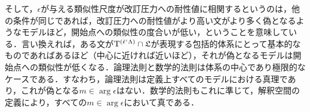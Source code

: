 そして，$\epsilon$が与える類似性尺度が改訂圧力への耐性値に相関するというのは，他の条件が同じであれば，改訂圧力への耐性値がより高い文がより多く偽となるようなモデルほど，開始点への類似性の度合いが低い，ということを意味している．言い換えれば，ある文が$ \mathrm{T}^{(\breve{\epsilon}{\mspace{1mu}{`}\mspace{1mu}} \Lambda)}\cap \mathfrak{L} $が表現する包括的体系にとって基本的なものであればあるほど（中心に近ければ近いほど），それが偽となるモデルは開始点への類似性が低くなる．論理法則と数学的法則は体系の中心であり極限的なケースである．すなわち，論理法則は定義上すべてのモデルにおける真理であり，これが偽となる$m\in\arg\epsilon$はない．数学的法則もこれに準じて，解釈空間の定義により，すべての$m\in\arg\epsilon$において真である．

